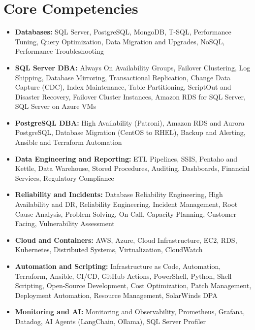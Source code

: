 \documentclass[10pt,a4paper]{article}
\begin{document}
\section{Core Competencies}
\begin{itemize}
  \item \textbf{Databases:} SQL Server, PostgreSQL, MongoDB, T-SQL, Performance Tuning, Query Optimization, Data Migration and Upgrades, NoSQL, Performance Troubleshooting
  \item \textbf{SQL Server DBA:} Always On Availability Groups, Failover Clustering, Log Shipping, Database Mirroring, Transactional Replication, Change Data Capture (CDC), Index Maintenance, Table Partitioning, ScriptOut and Disaster Recovery, Failover Cluster Instances, Amazon RDS for SQL Server, SQL Server on Azure VMs
  \item \textbf{PostgreSQL DBA:} High Availability (Patroni), Amazon RDS and Aurora PostgreSQL, Database Migration (CentOS to RHEL), Backup and Alerting, Ansible and Terraform Automation
  \item \textbf{Data Engineering and Reporting:} ETL Pipelines, SSIS, Pentaho and Kettle, Data Warehouse, Stored Procedures, Auditing, Dashboards, Financial Services, Regulatory Compliance
  \item \textbf{Reliability and Incidents:} Database Reliability Engineering, High Availability and DR, Reliability Engineering, Incident Management, Root Cause Analysis, Problem Solving, On-Call, Capacity Planning, Customer-Facing, Vulnerability Assessment
  \item \textbf{Cloud and Containers:} AWS, Azure, Cloud Infrastructure, EC2, RDS, Kubernetes, Distributed Systems, Virtualization, CloudWatch
  \item \textbf{Automation and Scripting:} Infrastructure as Code, Automation, Terraform, Ansible, CI/CD, GitHub Actions, PowerShell, Python, Shell Scripting, Open-Source Development, Cost Optimization, Patch Management, Deployment Automation, Resource Management, SolarWinds DPA
  \item \textbf{Monitoring and AI:} Monitoring and Observability, Prometheus, Grafana, Datadog, AI Agents (LangChain, Ollama), SQL Server Profiler
\end{itemize}
\end{document}
